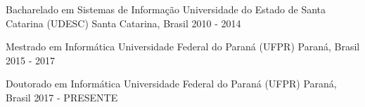 

\begin{cventries}

  \cventry
    {Bacharelado em Sistemas de Informação} %
    {Universidade do Estado de Santa Catarina (UDESC)} %
    {Santa Catarina, Brasil} %
    {2010 - 2014} %
    {
    }

  \cventry
	{Mestrado em Informática} %
	{Universidade Federal do Paraná (UFPR)} %
	{Paraná, Brasil} %
	{2015 - 2017} %
	{		
	}
	

  \cventry
	{Doutorado em Informática} %
	{Universidade Federal do Paraná (UFPR)} %
	{Paraná, Brasil} %
	{2017 - PRESENTE} %
	{	
	}

\end{cventries}
